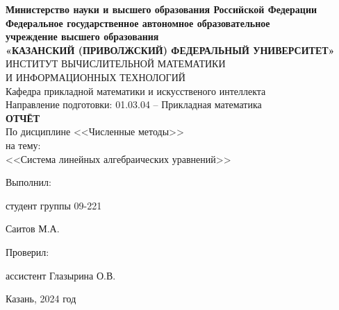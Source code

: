 \documentclass[a4paper,12pt]{article}
\begin{document}
\begin{center}
\hfill \break
\textbf{\large{Министерство науки и высшего образования Российской Федерации\\
Федеральное государственное автономное образовательное\\
учреждение высшего образования}}
\\
\large{\textbf{«КАЗАНСКИЙ (ПРИВОЛЖСКИЙ) ФЕДЕРАЛЬНЫЙ УНИВЕРСИТЕТ»}}\\
\hfill \break
\large{ИНСТИТУТ ВЫЧИСЛИТЕЛЬНОЙ МАТЕМАТИКИ\\ И ИНФОРМАЦИОННЫХ ТЕХНОЛОГИЙ}\\
 \hfill \break
\large{Кафедра прикладной математики и искусственого интеллекта}\\
\hfill\break
\hfill \break
\large{Направление подготовки: 01.03.04 – Прикладная математика}\\
\hfill \break
\hfill \break
\textbf{\large{ОТЧЁТ}}\\
\large{По дисциплине <<Численные методы>>}\\
\large{на тему:}\\
\large{<<Система линейных алгебраических уравнений>>}\\
\hfill \break
\hfill \break
\end{center}

\hfill \break
\begin{flushright}
			
    \large{Выполнил:}
    
    \large{студент группы 09-221}
    
    \large{Саитов М.А.}
    
    \large{Проверил:}
    
    \large{ассистент Глазырина О.В.}
    
\end{flushright}
\vfill
\begin{center} \large{Казань, 2024 год} \end{center}
\thispagestyle{empty}
 

\newpage
\begin{center}
\renewcommand{\contentsname}{Содержание}
\fontsize{14}{1.15}\selectfont
\mdseries\selectfont{\tableofcontents}
\end{center}
\newpage

\setlength{\parindent}{1.25cm}
\newpage
\selectfont\onehalfspacing
\end{document}
